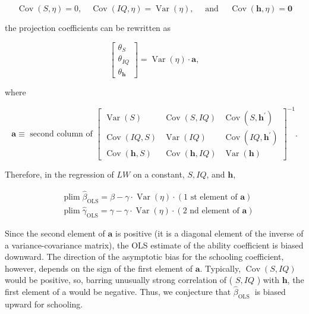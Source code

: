 \documentclass[10pt]{article}
\begin{document}
$$
\operatorname{Cov}(S, \eta)=0, \quad \operatorname{Cov}(I Q, \eta)=\operatorname{Var}(\eta), \quad \text { and } \quad \operatorname{Cov}(\mathbf{h}, \eta)=\mathbf{0}
$$

the projection coefficients can be rewritten as

$$
\left[\begin{array}{c}
\theta_{S} \\
\theta_{I Q} \\
\theta_{\mathbf{h}}
\end{array}\right]=\operatorname{Var}(\eta) \cdot \mathbf{a},
$$

where

$$
\mathbf{a} \equiv \text { second column of }\left[\begin{array}{ccc}
\operatorname{Var}(S) & \operatorname{Cov}(S, I Q) & \operatorname{Cov}\left(S, \mathbf{h}^{\prime}\right) \\
\operatorname{Cov}(I Q, S) & \operatorname{Var}(I Q) & \operatorname{Cov}\left(I Q, \mathbf{h}^{\prime}\right) \\
\operatorname{Cov}(\mathbf{h}, S) & \operatorname{Cov}(\mathbf{h}, I Q) & \operatorname{Var}(\mathbf{h})
\end{array}\right]^{-1} .
$$

Therefore, in the regression of $L W$ on a constant, $S, I Q$, and $\mathbf{h}$,


\begin{align*}
& \operatorname{plim} \widehat{\beta}_{\mathrm{OLS}}=\beta-\gamma \cdot \operatorname{Var}(\eta) \cdot(1 \text { st element of } \mathbf{a})  \tag{3.9.7a}\\
& \operatorname{plim} \hat{\gamma}_{\mathrm{OLS}}=\gamma-\gamma \cdot \operatorname{Var}(\eta) \cdot(2 \text { nd element of } \mathbf{a}) \tag{3.9.7b}
\end{align*}


Since the second element of $\mathbf{a}$ is positive (it is a diagonal element of the inverse of a variance-covariance matrix), the OLS estimate of the ability coefficient is biased downward. The direction of the asymptotic bias for the schooling coefficient, however, depends on the sign of the first element of $\mathbf{a}$. Typically, $\operatorname{Cov}(S, I Q)$ would be positive, so, barring unusually strong correlation of ( $S, I Q$ ) with $\mathbf{h}$, the first element of a would be negative. Thus, we conjecture that $\widehat{\beta}_{\text {OLS }}$ is biased upward for schooling.
\end{document}
